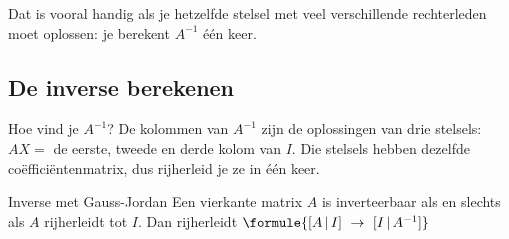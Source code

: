 
Dat is vooral handig als je hetzelfde stelsel met veel verschillende rechterleden moet oplossen: je berekent $A^{-1}$ één keer.

\begin{oefeningen}
\end{oefeningen}

\subsection{De inverse berekenen}

Hoe vind je $A^{-1}$? De kolommen van $A^{-1}$ zijn de oplossingen van drie stelsels: $AX = $ de eerste, tweede en derde kolom van $I$. Die stelsels hebben dezelfde coëfficiëntenmatrix, dus rijherleid je ze in één keer.

\begin{theorie}
\begin{stelling}{Inverse met Gauss-Jordan}
Een vierkante matrix $A$ is inverteerbaar als en slechts als $A$ rijherleidt tot $I$. Dan rijherleidt \quad $\formule{[A \,|\, I] \ \to \ [I \,|\, A^{-1}]}$
\end{stelling}
\end{theorie}

